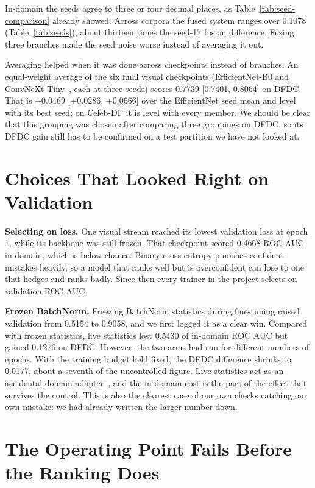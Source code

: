 In-domain the seeds agree to three or four decimal places, as
Table~\ref{tab:seed-comparison} already showed. Across corpora the fused system
ranges over 0.1078 (Table~\ref{tab:seeds}), about thirteen times the seed-17
fusion difference. Fusing three branches made the seed noise worse instead of
averaging it out.

Averaging helped when it was done across checkpoints instead of branches. An
equal-weight average of the six final visual checkpoints (EfficientNet-B0 and
ConvNeXt-Tiny~\cite{convnext}, each at three seeds) scores 0.7739
[0.7401, 0.8064] on DFDC. That is $+0.0469$ [$+0.0286$, $+0.0666$] over the
EfficientNet seed mean and level with its best seed; on Celeb-DF it is level
with every member. We should be clear that this grouping was chosen after
comparing three groupings on DFDC, so its DFDC gain still has to be confirmed
on a test partition we have not looked at.

\section{Choices That Looked Right on Validation}

\textbf{Selecting on loss.} One visual stream reached its lowest validation
loss at epoch 1, while its backbone was still frozen. That checkpoint scored
0.4668 ROC AUC in-domain, which is below chance. Binary cross-entropy punishes
confident mistakes heavily, so a model that ranks well but is overconfident can
lose to one that hedges and ranks badly. Since then every trainer in the
project selects on validation ROC AUC.

\textbf{Frozen BatchNorm.} Freezing BatchNorm statistics during fine-tuning
raised validation from 0.5154 to 0.9058, and we first logged it as a clear
win. Compared with frozen statistics, live statistics lost 0.5430 of
in-domain ROC AUC but gained 0.1276 on DFDC. However, the two arms had run for
different numbers of epochs. With the training budget held fixed, the DFDC
difference shrinks to 0.0177, about a seventh of the uncontrolled figure. Live
statistics act as an accidental domain adapter~\cite{adabn}, and the
in-domain cost is the part of the effect that survives the control. This is
also the clearest case of our own checks catching our own mistake: we had
already written the larger number down.

\section{The Operating Point Fails Before the Ranking Does}

